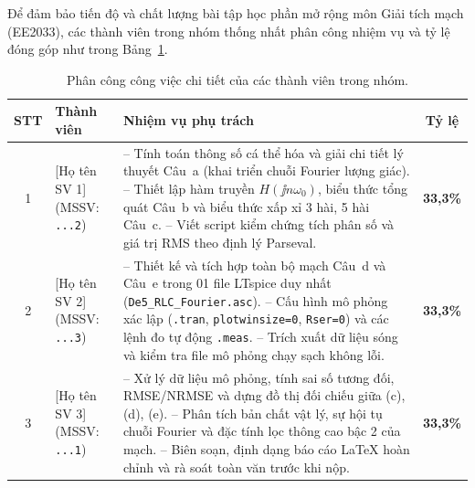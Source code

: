 Để đảm bảo tiến độ và chất lượng bài tập học phần mở rộng môn Giải tích mạch (EE2033), các thành viên trong nhóm thống nhất phân công nhiệm vụ và tỷ lệ đóng góp như trong Bảng~\ref{tab:phancong}.

\begin{table}[!htbp]
    \centering
    \caption{Phân công công việc chi tiết của các thành viên trong nhóm.}
    \label{tab:phancong}
    \vspace{4pt}
    \small
    \renewcommand{\arraystretch}{1.22}
    \begin{tabular}{|c|p{3.4cm}|>{\raggedright\arraybackslash}p{8.4cm}|c|}
        \toprule
        \textbf{STT} & \textbf{Thành viên} & \textbf{Nhiệm vụ phụ trách} & \textbf{Tỷ lệ} \\
        \midrule
        1 & {\color{accentred}[Họ tên SV 1]}\newline (MSSV: \texttt{...2}) &
        -- Tính toán thông số cá thể hóa và giải chi tiết lý thuyết Câu~a (khai triển chuỗi Fourier lượng giác).\newline
        -- Thiết lập hàm truyền $H(\jj n\omega_0)$, biểu thức tổng quát Câu~b và biểu thức xấp xỉ 3 hài, 5 hài Câu~c.\newline
        -- Viết script kiểm chứng tích phân số và giá trị RMS theo định lý Parseval.
        & \textbf{33,3\%} \\
        \hline
        2 & {\color{accentred}[Họ tên SV 2]}\newline (MSSV: \texttt{...3}) &
        -- Thiết kế và tích hợp toàn bộ mạch Câu~d và Câu~e trong 01 file LTspice duy nhất (\texttt{De5\_RLC\_Fourier.asc}).\newline
        -- Cấu hình mô phỏng xác lập (\texttt{.tran}, \texttt{plotwinsize=0}, \texttt{Rser=0}) và các lệnh đo tự động \texttt{.meas}.\newline
        -- Trích xuất dữ liệu sóng và kiểm tra file mô phỏng chạy sạch không lỗi.
        & \textbf{33,3\%} \\
        \hline
        3 & {\color{accentred}[Họ tên SV 3]}\newline (MSSV: \texttt{...1}) &
        -- Xử lý dữ liệu mô phỏng, tính sai số tương đối, RMSE/NRMSE và dựng đồ thị đối chiếu giữa (c), (d), (e).\newline
        -- Phân tích bản chất vật lý, sự hội tụ chuỗi Fourier và đặc tính lọc thông cao bậc 2 của mạch.\newline
        -- Biên soạn, định dạng báo cáo LaTeX hoàn chỉnh và rà soát toàn văn trước khi nộp.
        & \textbf{33,3\%} \\
        \bottomrule
    \end{tabular}
\end{table}

